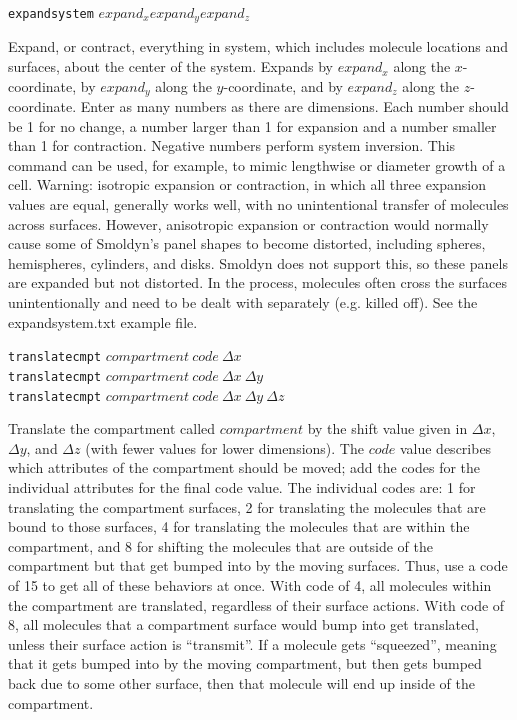 \documentclass {book}
\newcommand {\ttt} {\texttt}
\begin{document}
\begin{description}
\item{\ttt{expandsystem} $expand_x expand_y expand_z$}

Expand, or contract, everything in system, which includes molecule locations and surfaces, about the center of the system. Expands by $expand_x$ along the $x$-coordinate, by $expand_y$ along the $y$-coordinate, and by $expand_z$ along the $z$-coordinate. Enter as many numbers as there are dimensions. Each number should be 1 for no change, a number larger than 1 for expansion and a number smaller than 1 for contraction. Negative numbers perform system inversion. This command can be used, for example, to mimic lengthwise or diameter growth of a cell. Warning: isotropic expansion or contraction, in which all three expansion values are equal, generally works well, with no unintentional transfer of molecules across surfaces. However, anisotropic expansion or contraction would normally cause some of Smoldyn's panel shapes to become distorted, including spheres, hemispheres, cylinders, and disks. Smoldyn does not support this, so these panels are expanded but not distorted. In the process, molecules often cross the surfaces unintentionally and need to be dealt with separately (e.g. killed off). See the expandsystem.txt example file.

\item{\ttt{translatecmpt} $compartment\ code\ \Delta x$\\
\ttt{translatecmpt} $compartment\ code\ \Delta x\ \Delta y$\\
\ttt{translatecmpt} $compartment\ code\ \Delta x\ \Delta y\ \Delta z$}

Translate the compartment called $compartment$ by the shift value given in $\Delta x$, $\Delta y$, and $\Delta z$ (with fewer values for lower dimensions). The $code$ value describes which attributes of the compartment should be moved; add the codes for the individual attributes for the final code value. The individual codes are: 1 for translating the compartment surfaces, 2 for translating the molecules that are bound to those surfaces, 4 for translating the molecules that are within the compartment, and 8 for shifting the molecules that are outside of the compartment but that get bumped into by the moving surfaces. Thus, use a code of 15 to get all of these behaviors at once. With code of 4, all molecules within the compartment are translated, regardless of their surface actions. With code of 8, all molecules that a compartment surface would bump into get translated, unless their surface action is ``transmit''. If a molecule gets ``squeezed'', meaning that it gets bumped into by the moving compartment, but then gets bumped back due to some other surface, then that molecule will end up inside of the compartment.


\end{description}
\end{document}
